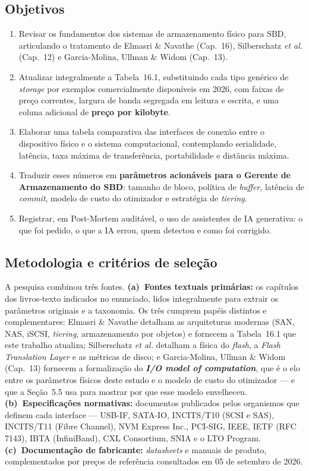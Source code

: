 \documentclass[11pt,a4paper]{article}
\begin{document}
\subsection{Objetivos}

\begin{enumerate}[label=\textbf{O\arabic*.}]
\item Revisar os fundamentos dos sistemas de armazenamento físico para SBD, articulando o
      tratamento de Elmasri \& Navathe (Cap.~16), Silberschatz \emph{et al.} (Cap.~12) e
      Garcia-Molina, Ullman \& Widom (Cap.~13).
\item Atualizar integralmente a Tabela~16.1, substituindo cada tipo genérico de
      \emph{storage} por exemplos comercialmente disponíveis em 2026, com faixas de preço
      correntes, largura de banda segregada em leitura e escrita, e uma coluna adicional
      de \textbf{preço por kilobyte}.
\item Elaborar uma tabela comparativa das interfaces de conexão entre o dispositivo físico
      e o sistema computacional, contemplando serialidade, latência, taxa máxima de
      transferência, portabilidade e distância máxima.
\item Traduzir esses números em \textbf{parâmetros acionáveis para o Gerente de
      Armazenamento do SBD}: tamanho de bloco, política de \emph{buffer}, latência de
      \emph{commit}, modelo de custo do otimizador e estratégia de \emph{tiering}.
\item Registrar, em Post-Mortem auditável, o uso de assistentes de IA generativa: o que foi
      pedido, o que a IA errou, quem detectou e como foi corrigido.
\end{enumerate}

\subsection{Metodologia e critérios de seleção}

A pesquisa combinou três fontes. \textbf{(a)~Fontes textuais primárias:} os capítulos dos
livros-texto indicados no enunciado, lidos integralmente para extrair os parâmetros
originais e a taxonomia. Os três cumprem papéis distintos e complementares: Elmasri \&
Navathe detalham as arquiteturas modernas (SAN, NAS, iSCSI, \emph{tiering}, armazenamento
por objetos) e fornecem a Tabela~16.1 que este trabalho atualiza; Silberschatz \emph{et al.}
detalham a física do \emph{flash}, a \emph{Flash Translation Layer} e as métricas de disco;
e Garcia-Molina, Ullman \& Widom (Cap.~13) fornecem a formalização do \textbf{\emph{I/O
model of computation}}, que é o elo entre os parâmetros físicos deste estudo e o modelo de
custo do otimizador --- e que a Seção~5.5 usa para mostrar por que esse modelo envelheceu. \textbf{(b)~Especificações normativas:} documentos publicados
pelos organismos que definem cada interface --- USB-IF, SATA-IO, INCITS/T10 (SCSI e SAS),
INCITS/T11 (Fibre Channel), NVM Express Inc., PCI-SIG, IEEE, IETF (RFC 7143), IBTA
(InfiniBand), CXL Consortium, SNIA e o LTO Program. \textbf{(c)~Documentação de
fabricante:} \emph{datasheets} e manuais de produto, complementados por preços de referência
consultados em 05 de setembro de 2026.
\end{document}
